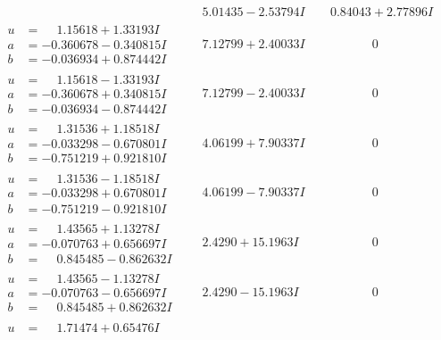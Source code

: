 \documentclass[1p]{elsarticle_modified}
\theoremstyle{definition}
\begin{document}
$$\begin{array}{c|c|c}
 & \phantom{-}5.01435 - 2.53794 I & \phantom{-}0.84043 + 2.77896 I \\ \hline\begin{aligned}
u &= \phantom{-}1.15618 + 1.33193 I \\
a &= -0.360678 - 0.340815 I \\
b &= -0.036934 + 0.874442 I\end{aligned}
 & \phantom{-}7.12799 + 2.40033 I & \phantom{-0.000000 } 0 \\ \hline\begin{aligned}
u &= \phantom{-}1.15618 - 1.33193 I \\
a &= -0.360678 + 0.340815 I \\
b &= -0.036934 - 0.874442 I\end{aligned}
 & \phantom{-}7.12799 - 2.40033 I & \phantom{-0.000000 } 0 \\ \hline\begin{aligned}
u &= \phantom{-}1.31536 + 1.18518 I \\
a &= -0.033298 - 0.670801 I \\
b &= -0.751219 + 0.921810 I\end{aligned}
 & \phantom{-}4.06199 + 7.90337 I & \phantom{-0.000000 } 0 \\ \hline\begin{aligned}
u &= \phantom{-}1.31536 - 1.18518 I \\
a &= -0.033298 + 0.670801 I \\
b &= -0.751219 - 0.921810 I\end{aligned}
 & \phantom{-}4.06199 - 7.90337 I & \phantom{-0.000000 } 0 \\ \hline\begin{aligned}
u &= \phantom{-}1.43565 + 1.13278 I \\
a &= -0.070763 + 0.656697 I \\
b &= \phantom{-}0.845485 - 0.862632 I\end{aligned}
 & \phantom{-}2.4290 + 15.1963 I & \phantom{-0.000000 } 0 \\ \hline\begin{aligned}
u &= \phantom{-}1.43565 - 1.13278 I \\
a &= -0.070763 - 0.656697 I \\
b &= \phantom{-}0.845485 + 0.862632 I\end{aligned}
 & \phantom{-}2.4290 - 15.1963 I & \phantom{-0.000000 } 0 \\ \hline\begin{aligned}
u &= \phantom{-}1.71474 + 0.65476 I \\

\end{aligned}
\end{array}$$
\end{document}
